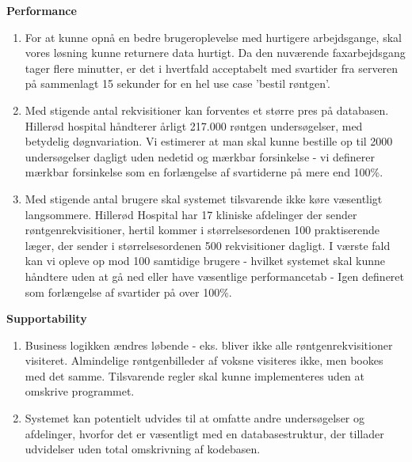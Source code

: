 \textbf{Performance}
\begin{enumerate}
  \item For at kunne opnå en bedre brugeroplevelse med hurtigere arbejdsgange,
  skal vores løsning kunne returnere data hurtigt. Da den nuværende
  faxarbejdsgang tager flere minutter, er det i hvertfald acceptabelt med
  svartider fra serveren på sammenlagt 15 sekunder for en hel use case 'bestil
  røntgen'.
  \item Med stigende antal rekvisitioner kan forventes et større pres på
  databasen. Hillerød hospital håndterer årligt 217.000 røntgen
  undersøgelser\cite{nordhospital}, med betydelig døgnvariation. Vi estimerer at
  man skal kunne bestille op til 2000 undersøgelser dagligt uden nedetid og mærkbar forsinkelse - vi definerer
  mærkbar forsinkelse som en forlængelse af svartiderne på mere end 100\%.
  \item Med stigende antal brugere skal systemet tilsvarende ikke køre
  væsentligt langsommere. Hillerød Hospital har 17 kliniske afdelinger der
  sender røntgenrekvisitioner, hertil kommer i størrelsesordenen 100
  praktiserende læger, der sender  i størrelsesordenen 500 rekvisitioner
  dagligt. I værste fald kan vi opleve op mod 100 samtidige brugere - hvilket
  systemet skal kunne håndtere uden at gå ned eller have væsentlige
  performancetab - Igen defineret som forlængelse af svartider på over 100\%.
\end{enumerate}
\textbf{Supportability}
\begin{enumerate}
  \item Business logikken ændres løbende - eks. bliver ikke alle
  røntgenrekvisitioner visiteret. Almindelige røntgenbilleder af voksne
  visiteres ikke, men bookes med det samme. Tilsvarende regler skal kunne
  implementeres uden at omskrive programmet.
  \item Systemet kan potentielt udvides til at omfatte andre undersøgelser og
  afdelinger, hvorfor det er væsentligt med en databasestruktur, der tillader
  udvidelser uden total omskrivning af kodebasen.
\end{enumerate}
